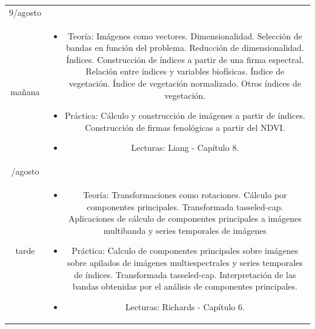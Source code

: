 \documentclass[11pt]{article}
\begin{document}
\begin{longtable}[h!]{ c  c  }
\midrule
9/agosto \\ ma\~nana & \begin{minipage}{.65\textwidth}
\begin{itemize}
    \vspace{1mm}
	\item Teoría: Imágenes como vectores. Dimensionalidad. Selección de bandas en función del problema. Reducción de dimensionalidad. Índices. Construcción de índices a partir de una firma espectral. Relación entre índices y variables biofísicas. Índice de vegetación. Índice de vegetación normalizado. Otros índices de vegetación.
  \item Práctica: Cálculo y construcción de imágenes a partir de índices. Construcción de firmas fenológicas a partir del NDVI.
	\item Lecturas: Liang - Capítulo 8.
    \vspace{1mm}
\end{itemize}
\end{minipage} \\
\newpage

\midrule
9/agosto \\tarde & \begin{minipage}{.65\textwidth}
\begin{itemize}
    \vspace{1mm}
	\item Teoría: Transformaciones como rotaciones. Cálculo por componentes principales. Transformada tasseled-cap. Aplicaciones de cálculo de componentes principales a imágenes multibanda y series temporales de imágenes
  \item Práctica: Calculo de componentes principales sobre imágenes sobre apilados de imágenes multiespectrales y series temporales de índices. Transformada tasseled-cap. Interpretación de las bandas obtenidas por el análisis de componentes principales.
	\item Lecturas: Richards - Capítulo 6.
    \vspace{1mm}
\end{itemize}
\end{minipage} \\


\end{longtable}
\end{document}
